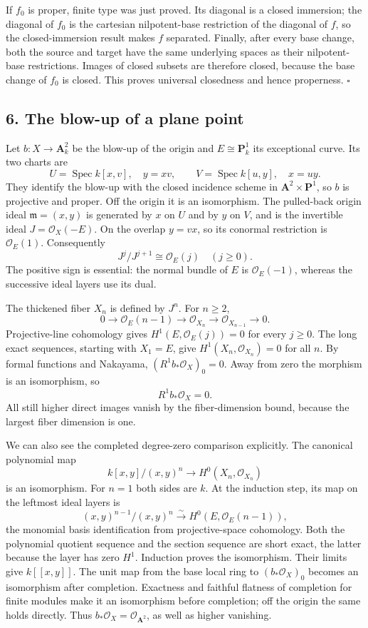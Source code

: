 \documentclass[11pt]{article}
\begin{document}
If \(f_0\) is proper, finite type was just proved. Its diagonal is a
closed immersion; the diagonal of \(f_0\) is the cartesian
nilpotent-base restriction of the diagonal of \(f\), so the
closed-immersion result makes \(f\) separated. Finally, after every base
change, both the source and target have the same underlying spaces as
their nilpotent-base restrictions. Images of closed subsets are
therefore closed, because the base change of \(f_0\) is closed. This
proves universal closedness and hence properness. \(\square\)

\subsection{6. The blow-up of a plane
point}\label{the-blow-up-of-a-plane-point}

Let \(b:X\to\mathbf A^2_k\) be the blow-up of the origin and
\(E\cong\mathbf P^1_k\) its exceptional curve. Its two charts are \[
U=\operatorname{Spec}k[x,v],\quad y=xv,
\qquad V=\operatorname{Spec}k[u,y],\quad x=uy.
\] They identify the blow-up with the closed incidence scheme in
\(\mathbf A^2\times\mathbf P^1\), so \(b\) is projective and proper. Off
the origin it is an isomorphism. The pulled-back origin ideal
\(\mathfrak m=(x,y)\) is generated by \(x\) on \(U\) and by \(y\) on
\(V\), and is the invertible ideal \(J=\mathcal O_X(-E)\). On the
overlap \(y=vx\), so its conormal restriction is \(\mathcal O_E(1)\).
Consequently \[
J^j/J^{j+1}\cong\mathcal O_E(j)\quad(j\geq0).
\] The positive sign is essential: the normal bundle of \(E\) is
\(\mathcal O_E(-1)\), whereas the successive ideal layers use its dual.

The thickened fiber \(X_n\) is defined by \(J^n\). For \(n\geq2\), \[
0\to\mathcal O_E(n-1)\to\mathcal O_{X_n}\to\mathcal O_{X_{n-1}}\to0.
\] Projective-line cohomology gives \(H^1(E,\mathcal O_E(j))=0\) for
every \(j\geq0\). The long exact sequences, starting with \(X_1=E\),
give \(H^1(X_n,\mathcal O_{X_n})=0\) for all \(n\). By formal functions
and Nakayama, \((R^1b_*\mathcal O_X)_0=0\). Away from zero the morphism
is an isomorphism, so \[
R^1b_*\mathcal O_X=0.
\] All still higher direct images vanish by the fiber-dimension bound,
because the largest fiber dimension is one.

We can also see the completed degree-zero comparison explicitly. The
canonical polynomial map \[
k[x,y]/(x,y)^n\longrightarrow H^0(X_n,\mathcal O_{X_n})
\] is an isomorphism. For \(n=1\) both sides are \(k\). At the induction
step, its map on the leftmost ideal layers is \[
(x,y)^{n-1}/(x,y)^n\xrightarrow{\sim}H^0(E,\mathcal O_E(n-1)),
\] the monomial basis identification from projective-space cohomology.
Both the polynomial quotient sequence and the section sequence are short
exact, the latter because the layer has zero \(H^1\). Induction proves
the isomorphism. Their limits give \(k[[x,y]]\). The unit map from the
base local ring to \((b_*\mathcal O_X)_0\) becomes an isomorphism after
completion. Exactness and faithful flatness of completion for finite
modules make it an isomorphism before completion; off the origin the
same holds directly. Thus \(b_*\mathcal O_X=\mathcal O_{\mathbf A^2}\),
as well as higher vanishing.
\end{document}

